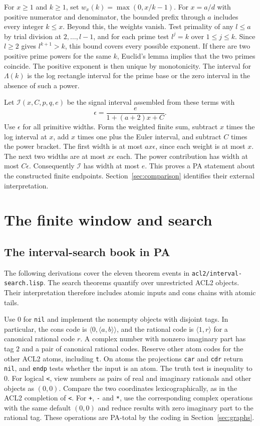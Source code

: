 \documentclass[11pt]{amsart}
\theoremstyle{definition}
\theoremstyle{remark}
\numberwithin{equation}{section}
\newcommand{\pair}[2]{\langle #1,#2\rangle}
\newcommand{\code}[1]{\nolinkurl{#1}}
\begin{document}
For $x\ge1$ and $k\ge1$, set $w_x(k)=\max(0,x/k-1)$.
For $x=a/d$ with positive numerator and denominator, the bounded
prefix through $a$ includes every integer $k\le x$. Beyond this,
the weights vanish. Test primality of any $l\le a$ by trial division
at $2,\ldots,l-1$, and for each prime test $l^j=k$ over
$1\le j\le k$. Since $l\ge2$ gives $l^{k+1}>k$, this bound
covers every possible exponent. If there are two positive prime
powers for the same $k$, Euclid's lemma implies that the two primes
coincide. The positive exponent is then unique by monotonicity.
The interval for $\Lambda(k)$ is the log rectangle interval
for the prime base or the zero interval in the absence of such a power.

Let $\mathcal I(x,C,p,q,e)$ be the signal interval assembled
from these terms with
\[
 \epsilon=\frac{e}{1+(a+2)x+C}.
\]
Use $\epsilon$ for all primitive widths. Form the weighted finite
sum, subtract $x$ times the log interval at $x$, add $x$ times one
plus the Euler interval, and subtract $C$ times the power bracket.
The first width is at most $ax\epsilon$, since each weight
is at most $x$. The next two widths are at most $x\epsilon$ each.
The power contribution has width at most $C\epsilon$.
Consequently $\mathcal I$ has width at most $e$.
This proves a PA statement about the constructed finite endpoints.
Section~\ref{sec:comparison} identifies their external interpretation.

\section{The finite window and search}

\subsection{The interval-search book in PA}
\label{sec:interval-search}

The following derivations cover the eleven theorem events in
\code{acl2/interval-search.lisp}. The search theorems quantify over
unrestricted ACL2 objects. Their interpretation therefore includes
atomic inputs and cons chains with atomic tails.

Use $0$ for \texttt{nil} and implement the nonempty objects with
disjoint tags. In particular, the cons code is
$\pair{0}{\pair{a}{b}}$, and the rational code is
$\pair{1}{r}$ for a canonical rational code $r$. A complex number
with nonzero imaginary part has tag $2$ and a pair of canonical
rational codes. Reserve other atom codes for the other ACL2 atoms,
including \texttt{t}. On atoms the projections \texttt{car} and
\texttt{cdr} return \texttt{nil}, and \texttt{endp} tests whether
the input is an atom. The truth test is inequality to $0$.
For logical \texttt{<}, view numbers as pairs of real and imaginary
rationals and other objects as $(0,0)$. Compare the two coordinates
lexicographically, as in the ACL2 completion of \texttt{<}.
For \texttt{+}, \texttt{-} and \texttt{*}, use the corresponding
complex operations with the same default $(0,0)$ and reduce results
with zero imaginary part to the rational tag. These operations are
PA-total by the coding in Section~\ref{sec:graphs}.
\end{document}
